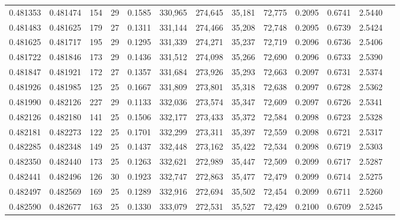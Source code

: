 \begin{tabular}{rrrrrrrrrrrrr}
0.481353 & 0.481474 & 154 &  29 &                                     0.1585 & 330,965 & 274,645 &  35,181 &  72,775 & 0.2095 & 0.6741 & 2.5440 \\
0.481483 & 0.481625 & 179 &  27 &                                     0.1311 & 331,144 & 274,466 &  35,208 &  72,748 & 0.2095 & 0.6739 & 2.5424 \\
0.481625 & 0.481717 & 195 &  29 &                                     0.1295 & 331,339 & 274,271 &  35,237 &  72,719 & 0.2096 & 0.6736 & 2.5406 \\
0.481722 & 0.481846 & 173 &  29 &                                     0.1436 & 331,512 & 274,098 &  35,266 &  72,690 & 0.2096 & 0.6733 & 2.5390 \\
0.481847 & 0.481921 & 172 &  27 &                                     0.1357 & 331,684 & 273,926 &  35,293 &  72,663 & 0.2097 & 0.6731 & 2.5374 \\
0.481926 & 0.481985 & 125 &  25 &                                     0.1667 & 331,809 & 273,801 &  35,318 &  72,638 & 0.2097 & 0.6728 & 2.5362 \\
0.481990 & 0.482126 & 227 &  29 &                                     0.1133 & 332,036 & 273,574 &  35,347 &  72,609 & 0.2097 & 0.6726 & 2.5341 \\
0.482126 & 0.482180 & 141 &  25 &                                     0.1506 & 332,177 & 273,433 &  35,372 &  72,584 & 0.2098 & 0.6723 & 2.5328 \\
0.482181 & 0.482273 & 122 &  25 &                                     0.1701 & 332,299 & 273,311 &  35,397 &  72,559 & 0.2098 & 0.6721 & 2.5317 \\
0.482285 & 0.482348 & 149 &  25 &                                     0.1437 & 332,448 & 273,162 &  35,422 &  72,534 & 0.2098 & 0.6719 & 2.5303 \\
0.482350 & 0.482440 & 173 &  25 &                                     0.1263 & 332,621 & 272,989 &  35,447 &  72,509 & 0.2099 & 0.6717 & 2.5287 \\
0.482441 & 0.482496 & 126 &  30 &                                     0.1923 & 332,747 & 272,863 &  35,477 &  72,479 & 0.2099 & 0.6714 & 2.5275 \\
0.482497 & 0.482569 & 169 &  25 &                                     0.1289 & 332,916 & 272,694 &  35,502 &  72,454 & 0.2099 & 0.6711 & 2.5260 \\
0.482590 & 0.482677 & 163 &  25 &                                     0.1330 & 333,079 & 272,531 &  35,527 &  72,429 & 0.2100 & 0.6709 & 2.5245 \\

\end{tabular}

